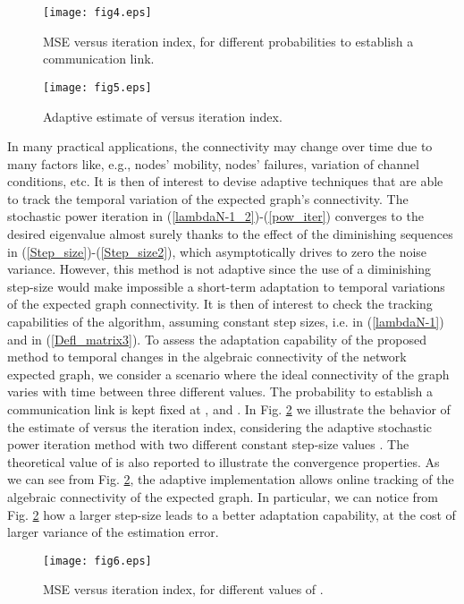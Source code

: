 \documentclass[10pt,twocolumn]{IEEEtran}
\begin{document}
\begin{figure}[t]
\centering
\texttt{[image: fig4.eps]}
  \caption{MSE versus iteration index, for different probabilities to establish a communication link.}\label{MSE_lambda2}
\end{figure}

\begin{figure}[t]
\centering
\texttt{[image: fig5.eps]}
  \caption{Adaptive estimate of  versus iteration index.}\label{tracking}
\end{figure}


 In many practical applications, the connectivity may change over time due to many factors like, e.g., nodes' mobility, nodes' failures, variation of channel conditions, etc. It is then of interest to devise adaptive techniques that are able to track the temporal variation of the expected graph's connectivity. The stochastic power iteration in (\ref{lambdaN-1_2})-(\ref{pow_iter}) converges to the desired eigenvalue almost surely thanks to the effect of the diminishing sequences in (\ref{Step_size})-(\ref{Step_size2}), which asymptotically drives to zero the noise variance. However, this method is not adaptive since the use of a diminishing step-size would make impossible a short-term adaptation to temporal variations of the expected graph connectivity. It is then of interest to check the tracking capabilities of the  algorithm, assuming constant step sizes, i.e.  in (\ref{lambdaN-1}) and  in (\ref{Defl_matrix3}). To assess the adaptation capability of the proposed method to temporal changes in the algebraic connectivity of the network expected graph, we consider a scenario where the ideal connectivity of the graph varies with time between three different values. The probability to establish a communication link is kept fixed at , and . In Fig. \ref{tracking} we illustrate the behavior of the estimate of  versus the iteration index, considering the adaptive stochastic power iteration method with two different constant step-size values . The theoretical value of  is also reported to illustrate the convergence properties. As we can see from Fig. \ref{tracking}, the adaptive implementation allows online tracking of the algebraic connectivity of the expected graph. In particular, we can notice from Fig. \ref{tracking} how a larger step-size leads to a better adaptation capability, at the cost of larger variance of the estimation error.

\begin{figure}[t]
\centering
\texttt{[image: fig6.eps]}
  \caption{MSE versus iteration index, for different values of .}\label{MSE_delta}
\end{figure}
\end{document}
